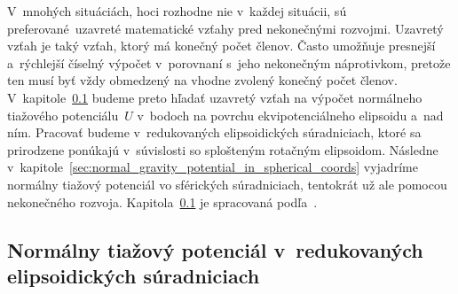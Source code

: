 \documentclass[a4paper, 12pt]{book}
\begin{document}
V~mnohých situáciách, hoci rozhodne nie v~každej situácii, sú 
preferované~uzavreté matematické vzťahy pred nekonečnými rozvojmi.  Uzavretý 
vzťah je taký vzťah, ktorý má konečný počet členov.  Často umožňuje presnejší 
a~rýchlejší číselný výpočet v~porovnaní s~jeho nekonečným náprotivkom, pretože 
ten musí byť vždy obmedzený na vhodne zvolený konečný počet členov.  
V~kapitole~\ref{sec:normal_gravity_potential_in_reduced_ell_coords} budeme 
preto hľadať uzavretý vzťah na výpočet normálneho tiažového potenciálu~$U$ 
v~bodoch na povrchu ekvipotenciálneho elipsoidu a~nad ním.  Pracovať budeme 
v~redukovaných elipsoidických súradniciach, ktoré sa prirodzene ponúkajú 
v~súvislosti so splošteným rotačným elipsoidom.  Následne 
v~kapitole~\ref{sec:normal_gravity_potential_in_spherical_coords} vyjadríme 
normálny tiažový potenciál vo sférických súradniciach, tentokrát už ale pomocou 
nekonečného rozvoja.  
Kapitola~\ref{sec:normal_gravity_potential_in_reduced_ell_coords} je spracovaná 
podľa~\textcite{MoritzTheFigureOfTheEarth}.



\subsection{Normálny tiažový potenciál v~redukovaných elipsoidických 
súradniciach}
\label{sec:normal_gravity_potential_in_reduced_ell_coords}
\end{document}
